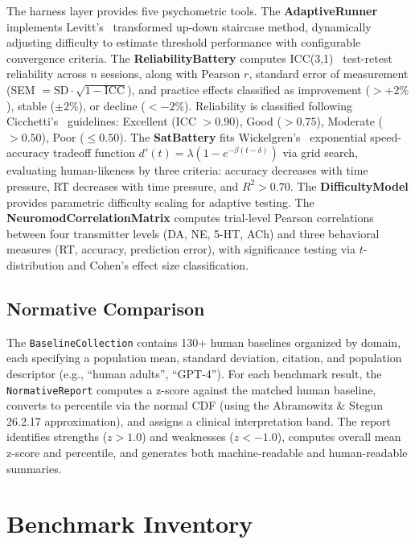 \documentclass[11pt,letterpaper]{article}
\begin{document}
The harness layer provides five psychometric tools. The \textbf{AdaptiveRunner} implements Levitt's~\citep{levitt1971transformed} transformed up-down staircase method, dynamically adjusting difficulty to estimate threshold performance with configurable convergence criteria. The \textbf{ReliabilityBattery} computes ICC(3,1)~\citep{shrout1979intraclass} test-retest reliability across $n$ sessions, along with Pearson $r$, standard error of measurement (SEM $= \text{SD} \cdot \sqrt{1 - \text{ICC}}$), and practice effects classified as improvement ($> +2\%$), stable ($\pm 2\%$), or decline ($< -2\%$). Reliability is classified following Cicchetti's~\citep{cicchetti1994guidelines} guidelines: Excellent (ICC $> 0.90$), Good ($> 0.75$), Moderate ($> 0.50$), Poor ($\leq 0.50$). The \textbf{SatBattery} fits Wickelgren's~\citep{wickelgren1977speed} exponential speed-accuracy tradeoff function $d'(t) = \lambda(1 - e^{-\beta(t - \delta)})$ via grid search, evaluating human-likeness by three criteria: accuracy decreases with time pressure, RT decreases with time pressure, and $R^2 > 0.70$. The \textbf{DifficultyModel} provides parametric difficulty scaling for adaptive testing. The \textbf{NeuromodCorrelationMatrix} computes trial-level Pearson correlations between four transmitter levels (DA, NE, 5-HT, ACh) and three behavioral measures (RT, accuracy, prediction error), with significance testing via $t$-distribution and Cohen's effect size classification.

\subsection{Normative Comparison}

The \texttt{BaselineCollection} contains 130+ human baselines organized by domain, each specifying a population mean, standard deviation, citation, and population descriptor (e.g., ``human adults'', ``GPT-4''). For each benchmark result, the \texttt{NormativeReport} computes a z-score against the matched human baseline, converts to percentile via the normal CDF (using the Abramowitz \& Stegun 26.2.17 approximation), and assigns a clinical interpretation band. The report identifies strengths ($z > 1.0$) and weaknesses ($z < -1.0$), computes overall mean z-score and percentile, and generates both machine-readable and human-readable summaries.

\section{Benchmark Inventory}
\label{sec:inventory}
\end{document}
